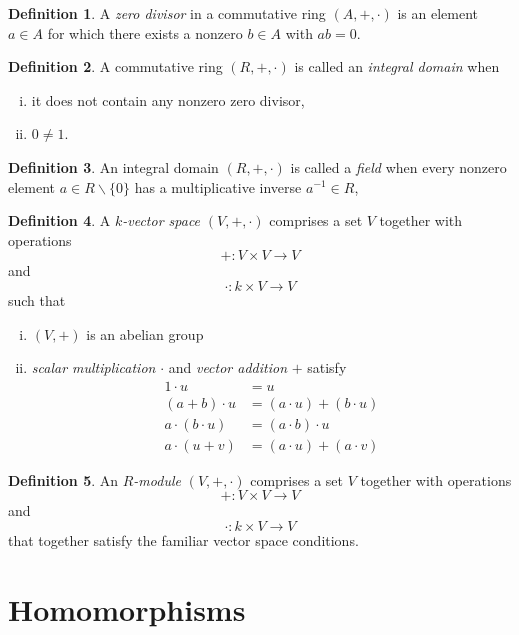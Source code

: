 \documentclass{article}
\theoremstyle{definition}
\newtheorem{definition}{Definition}
\begin{document}
\begin{definition}
	A \emph{zero divisor} in a commutative ring $(A,+,\cdot)$ is an element $a\in A$ for which there exists a nonzero $b\in A$ with $ab=0$.
\end{definition}

\begin{definition}
	A commutative ring $(R,+,\cdot)$ is called an \emph{integral domain} when
	\begin{enumerate}[i.]
		\item it does not contain any nonzero zero divisor,
		\item $0\neq 1$.
	\end{enumerate}
\end{definition}

\begin{definition}
	An integral domain $(R,+,\cdot)$ is called a \emph{field} when every nonzero element $a\in R\backslash\{0\}$ has a multiplicative inverse $a^{-1}\in R$,
\end{definition}

\begin{definition}
	A \emph{$k$-vector space} $(V,+,\cdot)$ comprises a set $V$ together with operations
	\[
		+ : V\times V \to V
	\]
	and
	\[
		\cdot : k\times V \to V
	\]
	such that
	\begin{enumerate}[i.]
		\item $(V,+)$ is an abelian group
		\item \emph{scalar multiplication} $\cdot$ and \emph{vector addition} $+$ satisfy
			\begin{align*}
				1 \cdot u		&=	u			\\
				(a+b)\cdot u		&=	(a\cdot u) + (b\cdot u)	\\
				a\cdot(b\cdot u)	&=	(a\cdot b)\cdot u	\\
				a\cdot(u+v)		&=	(a\cdot u)+(a\cdot v)
			\end{align*}
	\end{enumerate}
\end{definition}

\begin{definition}
	An \emph{$R$-module} $(V,+,\cdot)$ comprises a set $V$ together with operations
	\[
		+ : V\times V \to V
	\]
	and
	\[
		\cdot : k\times V \to V
	\]
	that together satisfy the familiar vector space conditions.
\end{definition}


\section*{Homomorphisms}
\end{document}
